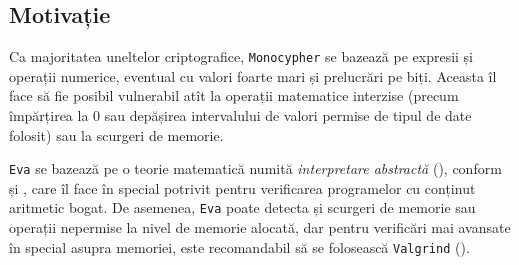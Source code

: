 \subsection{Motivație}
\indent\indent Ca majoritatea uneltelor criptografice, \texttt{Monocypher}
se bazează pe expresii și operații numerice, eventual cu valori foarte
mari și prelucrări pe biți. Aceasta îl face să fie posibil vulnerabil
atît la operații matematice interzise (precum împărțirea la 0 sau depășirea
intervalului de valori permise de tipul de date folosit) sau la scurgeri de memorie.

\texttt{Eva} se bazează pe o teorie matematică numită \emph{interpretare abstractă}
(\cite{wikiabs}), conform și \cite{eva}, care îl face în special potrivit
pentru verificarea programelor cu conținut aritmetic bogat. De asemenea,
\texttt{Eva} poate detecta și scurgeri de memorie sau operații nepermise la nivel
de memorie alocată, dar pentru verificări mai avansate în special asupra memoriei,
este recomandabil să se folosească \texttt{Valgrind} (\cite{valgrind}).

